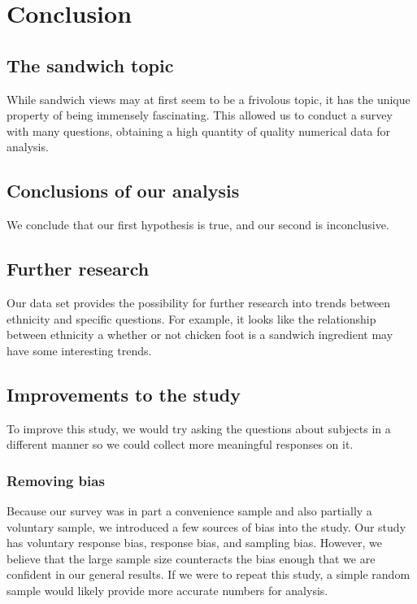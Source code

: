 \chapter{Conclusion}

\section{The sandwich topic}
While sandwich views may at first seem to be a frivolous topic, it has the unique property of being immensely fascinating.
This allowed us to conduct a survey with many questions, obtaining a high quantity of quality numerical data for analysis.

\section{Conclusions of our analysis}
We conclude that our first hypothesis is true, and our second is inconclusive.

\section{Further research}
Our data set provides the possibility for further research into trends between ethnicity and specific questions.
For example, it looks like the relationship between ethnicity a whether or not chicken foot is a sandwich ingredient may have some interesting trends.

\section{Improvements to the study}
To improve this study, we would try asking the questions about subjects in a different manner so we could collect more meaningful responses on it.

\subsection{Removing bias}
Because our survey was in part a convenience sample and also partially a voluntary sample, we introduced a few sources of bias into the study.
Our study has voluntary response bias, response bias, and sampling bias.
However, we believe that the large sample size counteracts the bias enough that we are confident in our general results.
If we were to repeat this study, a simple random sample would likely provide more accurate numbers for analysis.
